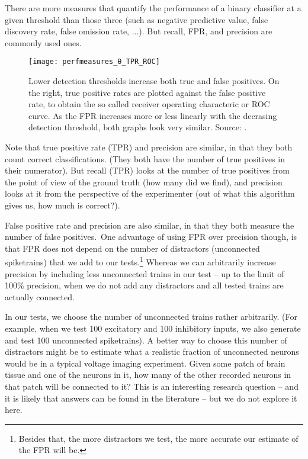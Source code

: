 There are more measures that quantify the performance of a binary classifier at a given threshold than those three (such as negative predictive value, false discovery rate, false omission rate, ...).\footnotemark{}
But recall, FPR, and precision are commonly used ones.

\begin{figure}
    \texttt{[image: perfmeasures\_θ\_TPR\_ROC]}
    \caption
    {Lower detection thresholds increase both true and false positives. On the right, true positive rates are plotted against the false positive rate, to obtain the so called receiver operating characteric or ROC curve. As the FPR increases more or less linearly with the decrasing detection threshold, both graphs look very similar.
    Source: .}
    \label{fig:perfmeasures_θ_TPR_ROC}
\end{figure}

Note that true positive rate (TPR) and precision are similar, in that they both count correct classifications. (They both have the number of true positives in their numerator). But recall (TPR) looks at the number of true positives from the point of view of the ground truth (how many did we find), and precision looks at it from the perspective of the experimenter (out of what this algorithm gives us, how much is correct?).

False positive rate and precision are also similar, in that they both measure the number of false positives.\
One advantage of using FPR over precision though, is that FPR does not depend on the number of distractors (unconnected spiketrains) that we add to our tests.\footnote{Besides that, the more distractors we test, the more accurate our estimate of the FPR will be.}
Whereas we can arbitrarily increase precision by including less unconnected trains in our test -- up to the limit of 100\% precision, when we do not add any distractors and all tested trains are actually connected.

In our tests, we choose the number of unconnected trains rather arbitrarily. (For example, when we test 100 excitatory and 100 inhibitory inputs, we also generate and test 100 unconnected spiketrains). A better way to choose this number of distractors might be to estimate what a realistic fraction of unconnected neurons would be in a typical voltage imaging experiment. Given some patch of brain tissue and one of the neurons in it, how many of the other recorded neurons in that patch will be connected to it? This is an interesting research question -- and it is likely that answers can be found in the literature -- but we do not explore it here.

